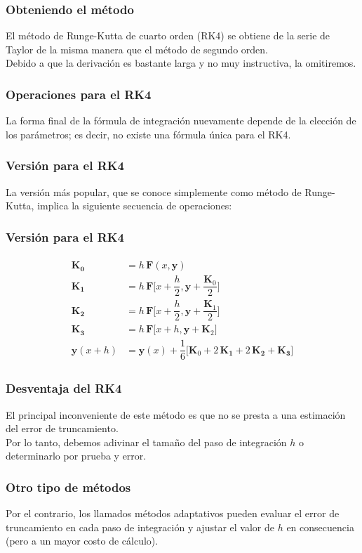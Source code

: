 \documentclass[12pt]{beamer}
\begin{document}
\begin{frame}
\frametitle{Obteniendo el método}
El \textcolor{cadmiumgreen}{método de Runge-Kutta de cuarto orden} (RK4) se obtiene de la serie de Taylor de la misma manera que el método de segundo orden.
\\
\bigskip
\pause
Debido a que la derivación es bastante larga y no muy instructiva, la omitiremos.
\end{frame}
\begin{frame}
\frametitle{Operaciones para el RK4}
La forma final de la fórmula de integración nuevamente depende de la elección de los parámetros; \pause es decir, no existe una fórmula única para el RK4.
\end{frame}
\begin{frame}
\frametitle{Versión para el RK4}
La versión más popular, que se conoce simplemente como \textcolor{cornellred}{método de Runge-Kutta}, implica la siguiente secuencia de operaciones:
\end{frame}
\begin{frame}
\frametitle{Versión para el RK4}
\begin{align}
\begin{aligned}
\mathbf{K_{0}} &= h \, \mathbf{F} (x, \mathbf{y}) \\
\mathbf{K_{1}} &= h \, \mathbf{F} \bigg[x + \dfrac{h}{2}, \mathbf{y} + \dfrac{\mathbf{K}_{0}}{2} \bigg] \\
\mathbf{K_{2}} &= h \, \mathbf{F} \bigg[x + \dfrac{h}{2}, \mathbf{y} + \dfrac{\mathbf{K}_{1}}{2} \bigg] \\
\mathbf{K_{3}} &= h \, \mathbf{F} \big[x + h, \mathbf{y} + \mathbf{K}_{2} \big] \\
\mathbf{y} (x + h) &= \mathbf{y} (x) + \dfrac{1}{6} \bigg[ \mathbf{K}_{0} + 2 \, \mathbf{K_{1}} + 2 \, \mathbf{K_{2}} + \mathbf{K_{3}} \bigg]
\end{aligned}
\label{eq:ecuacion_07_10}
\end{align}
\end{frame}
\begin{frame}
\frametitle{Desventaja del RK4}
El principal inconveniente de este método es que no se presta a una estimación del error de truncamiento.
\\
\bigskip
\pause
Por lo tanto, debemos adivinar el tamaño del paso de integración $h$ o determinarlo por prueba y error.
\end{frame}
\begin{frame}
\frametitle{Otro tipo de métodos}
Por el contrario, los llamados \textcolor{darkcerulean}{métodos adaptativos} pueden evaluar el error de truncamiento en cada paso de integración y ajustar el valor de $h$ en consecuencia (pero a un mayor costo de cálculo).
\end{frame}
\end{document}
